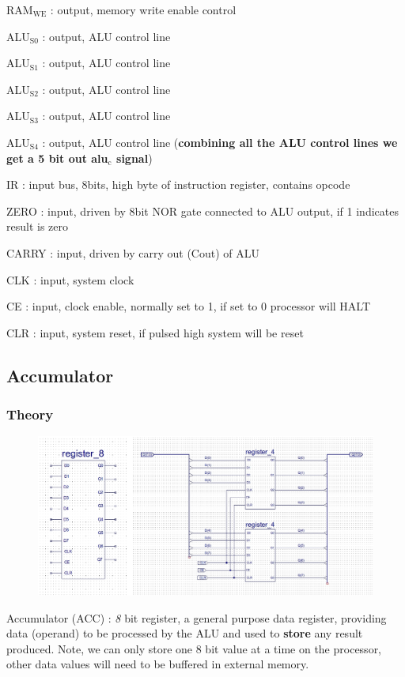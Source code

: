 \documentclass[11pt]{article}
\begin{document}
RAM\(_{\text{WE}}\) : output, memory write enable control 

ALU\(_{\text{S0}}\) : output, ALU control line 

ALU\(_{\text{S1}}\) : output, ALU control line

ALU\(_{\text{S2}}\) : output, ALU control line 

ALU\(_{\text{S3}}\) : output, ALU control line 

ALU\(_{\text{S4}}\) : output, ALU control line 
 (\textbf{combining all the ALU control lines we get a 5 bit out alu\(_{\text{c}}\) signal}) 

IR : input bus, 8bits, high byte of instruction register, contains opcode 

ZERO : input, driven by 8bit NOR gate connected to ALU output, if 1 indicates result is zero 

CARRY : input, driven by carry out (Cout) of ALU 

CLK : input, system clock 

CE : input, clock enable, normally set to 1, if set to 0 processor will HALT 

CLR : input, system reset, if pulsed high system will be reset 

\subsection{Accumulator}
\label{sec:orgf0d36bf}
\subsubsection{Theory}
\label{sec:org97d4bcd}
\begin{figure}[htbp]
\centering
\includegraphics[width=.9\linewidth]{./images/reg8.jpg}
\caption{\label{fig:org667cddb}
}
\end{figure}
Accumulator (ACC) : \emph{8} bit register, a general purpose data register, providing data (operand) to be processed by the ALU and used to \textbf{store} any result produced. Note, we can only store one 8 bit value at a time on the processor, other data values will need to be buffered in external memory.
\end{document}
